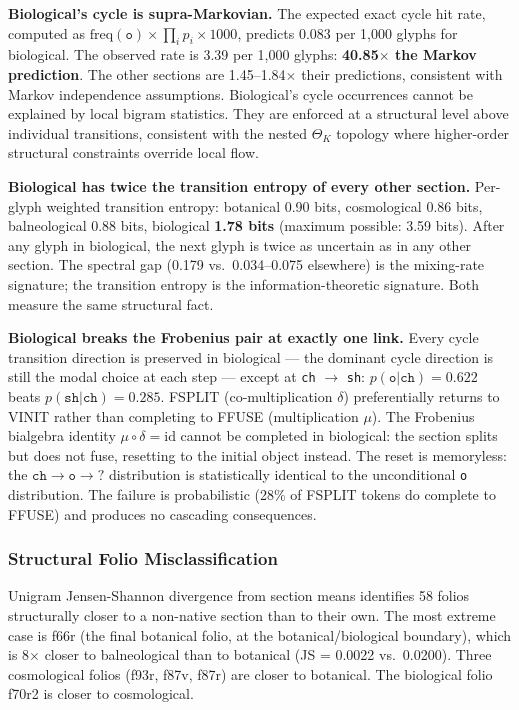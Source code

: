 \documentclass[12pt,a4paper]{article}
\begin{document}
\textbf{Biological's cycle is supra-Markovian.} The expected exact cycle hit rate, computed as $\mathrm{freq}(\texttt{o}) \times \prod_i p_i \times 1000$, predicts 0.083 per 1,000 glyphs for biological. The observed rate is 3.39 per 1,000 glyphs: \textbf{40.85$\times$ the Markov prediction}. The other sections are 1.45--1.84$\times$ their predictions, consistent with Markov independence assumptions. Biological's cycle occurrences cannot be explained by local bigram statistics. They are enforced at a structural level above individual transitions, consistent with the nested $\Theta_K$ topology where higher-order structural constraints override local flow.

\textbf{Biological has twice the transition entropy of every other section.} Per-glyph weighted transition entropy: botanical 0.90 bits, cosmological 0.86 bits, balneological 0.88 bits, biological \textbf{1.78 bits} (maximum possible: 3.59 bits). After any glyph in biological, the next glyph is twice as uncertain as in any other section. The spectral gap (0.179 vs.\ 0.034--0.075 elsewhere) is the mixing-rate signature; the transition entropy is the information-theoretic signature. Both measure the same structural fact.

\textbf{Biological breaks the Frobenius pair at exactly one link.} Every cycle transition direction is preserved in biological --- the dominant cycle direction is still the modal choice at each step --- except at \texttt{ch} $\to$ \texttt{sh}: $p(\texttt{o}|\texttt{ch}) = 0.622$ beats $p(\texttt{sh}|\texttt{ch}) = 0.285$. FSPLIT (co-multiplication $\delta$) preferentially returns to VINIT rather than completing to FFUSE (multiplication $\mu$). The Frobenius bialgebra identity $\mu \circ \delta = \mathrm{id}$ cannot be completed in biological: the section splits but does not fuse, resetting to the initial object instead. The reset is memoryless: the $\texttt{ch} \to \texttt{o} \to ?$ distribution is statistically identical to the unconditional \texttt{o} distribution. The failure is probabilistic (28\% of FSPLIT tokens do complete to FFUSE) and produces no cascading consequences.

\subsubsection{Structural Folio Misclassification}

Unigram Jensen-Shannon divergence from section means identifies 58 folios structurally closer to a non-native section than to their own. The most extreme case is f66r (the final botanical folio, at the botanical/biological boundary), which is 8$\times$ closer to balneological than to botanical (JS = 0.0022 vs.\ 0.0200). Three cosmological folios (f93r, f87v, f87r) are closer to botanical. The biological folio f70r2 is closer to cosmological.
\end{document}
